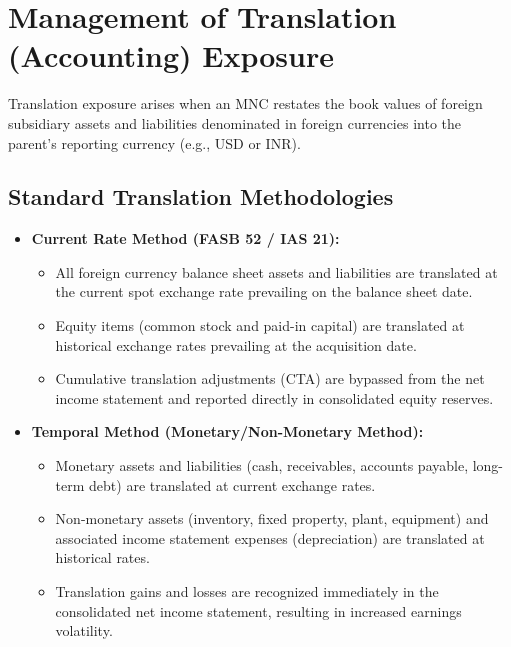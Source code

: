 \vspace{0.5em}

\section{Management of Translation (Accounting) Exposure}
\label{sec:translation_exposure}

Translation exposure arises when an MNC restates the book values of foreign subsidiary assets and liabilities denominated in foreign currencies into the parent's reporting currency (e.g., USD or INR).

\subsection{Standard Translation Methodologies}
\begin{itemize}[leftmargin=1.5em]
    \item \textbf{Current Rate Method (FASB 52 / IAS 21):}
    \begin{itemize}[noitemsep]
        \item All foreign currency balance sheet assets and liabilities are translated at the current spot exchange rate prevailing on the balance sheet date.
        \item Equity items (common stock and paid-in capital) are translated at historical exchange rates prevailing at the acquisition date.
        \item Cumulative translation adjustments (CTA) are bypassed from the net income statement and reported directly in consolidated equity reserves.
    \end{itemize}
    \item \textbf{Temporal Method (Monetary/Non-Monetary Method):}
    \begin{itemize}[noitemsep]
        \item Monetary assets and liabilities (cash, receivables, accounts payable, long-term debt) are translated at current exchange rates.
        \item Non-monetary assets (inventory, fixed property, plant, equipment) and associated income statement expenses (depreciation) are translated at historical rates.
        \item Translation gains and losses are recognized immediately in the consolidated net income statement, resulting in increased earnings volatility.
    \end{itemize}
\end{itemize}

